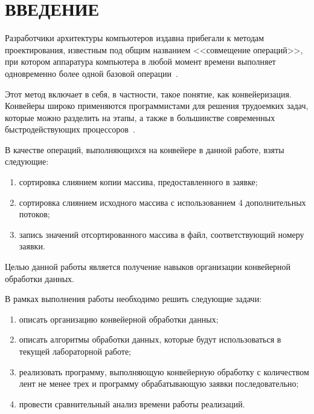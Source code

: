 \chapter*{\hfill{\centering  ВВЕДЕНИЕ}\hfill}


Разработчики архитектуры компьютеров издавна прибегали к методам проектирования, известным под общим названием <<совмещение операций>>, при котором аппаратура компьютера в любой момент времени выполняет одновременно более одной базовой операции~\cite{conveyor}.

Этот метод включает в себя, в частности, такое понятие, как конвейеризация.
Конвейеры широко применяются программистами для решения трудоемких задач, которые можно разделить на этапы, а также в большинстве современных быстродействующих процессоров~\cite{conveyor}.

В качестве операций, выполняющихся на конвейере в данной работе, взяты следующие:
\begin{enumerate}
	\item сортировка слиянием копии массива, предоставленного в заявке;
	\item сортировка слиянием исходного массива с использованием 4 дополнительных потоков;
	\item запись значений отсортированного массива в файл, соответствующий номеру заявки.
\end{enumerate}

Целью данной работы является получение навыков организации конвейерной обработки данных.

В рамках выполнения работы необходимо решить следующие задачи: 
\begin{enumerate}
	\item описать организацию конвейерной обработки данных;
	\item описать алгоритмы обработки данных, которые будут использоваться в текущей лабораторной работе;
	\item реализовать программу, выполняющую конвейерную обработку с количеством лент не менее трех  и программу обрабатывающую заявки последовательно;
	\item провести сравнительный анализ времени работы реализаций.
\end{enumerate}



